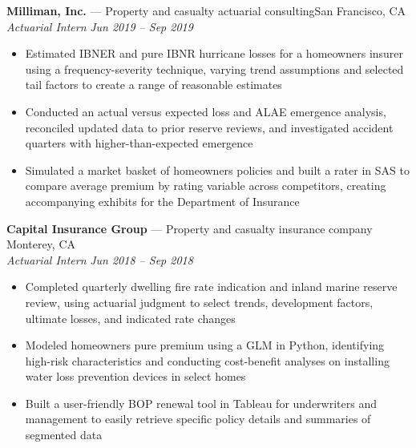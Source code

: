 \documentclass[11pt,letterpaper]{article}
\newcommand{\smallspace}{\vspace{6pt}}
\begin{document}
\smallspace
\textbf{Milliman, Inc.} --- Property and casualty actuarial consulting\hfill San Francisco, CA \\
\textit{Actuarial Intern} \hfill \textit{Jun 2019 -- Sep 2019}
\begin{itemize}
	\item Estimated IBNER and pure IBNR hurricane losses for a homeowners insurer using a frequency-severity technique, varying trend assumptions and selected tail factors to create a range of reasonable estimates
	\item Conducted an actual versus expected loss and ALAE emergence analysis, reconciled updated data to prior reserve reviews, and investigated accident quarters with higher-than-expected emergence
	\item Simulated a market basket of homeowners policies and built a rater in SAS to compare average premium by rating variable across competitors, creating accompanying exhibits for the Department of Insurance
\end{itemize}
\smallspace 
\textbf{Capital Insurance Group} --- Property and casualty insurance company \hfill Monterey, CA \\
\textit{Actuarial Intern} \hfill \textit{Jun 2018 -- Sep 2018}
\begin{itemize}
	\item Completed quarterly dwelling fire rate indication and inland marine reserve review, using actuarial judgment to select trends, development factors, ultimate losses, and indicated rate changes
	\item Modeled homeowners pure premium using a GLM in Python, identifying high-risk characteristics and conducting cost-benefit analyses on installing water loss prevention devices in select homes
	\item Built a user-friendly BOP renewal tool in Tableau for underwriters and management to easily retrieve specific policy details and summaries of segmented data	
\end{itemize}
\end{document}
